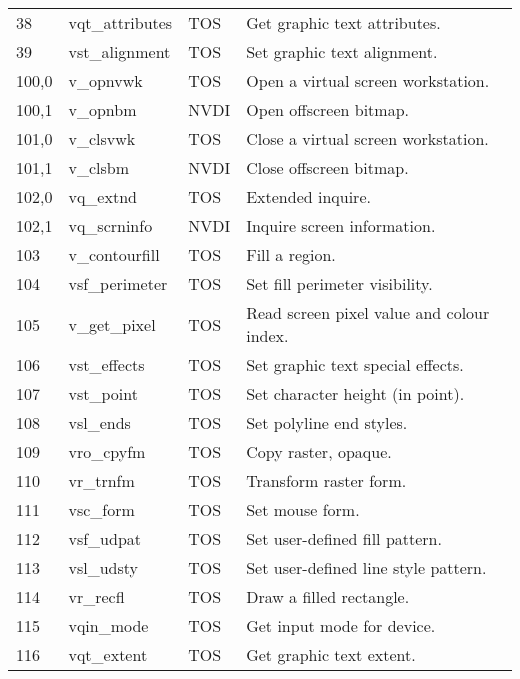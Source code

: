 \documentclass[a4paper]{article}
\begin{document}
\begin{supertabular}{|p{1.8cm}|p{3.0cm}|p{1.5cm}|p{8.7cm}|}
38              & vqt\_attributes     & TOS   & Get graphic text attributes. \\
39              & vst\_alignment      & TOS   & Set graphic text alignment. \\
100,0           & v\_opnvwk           & TOS   & Open a virtual screen workstation. \\
100,1           & v\_opnbm            & NVDI  & Open offscreen bitmap.\\
101,0           & v\_clsvwk           & TOS   & Close a virtual screen workstation. \\
101,1           & v\_clsbm            & NVDI  & Close offscreen bitmap.\\
102,0           & vq\_extnd           & TOS   & Extended inquire. \\
102,1           & vq\_scrninfo        & NVDI  & Inquire screen information.\\
103             & v\_contourfill      & TOS   & Fill a region. \\
104             & vsf\_perimeter      & TOS   & Set fill perimeter visibility. \\
105             & v\_get\_pixel       & TOS   & Read screen pixel value and colour index. \\
106             & vst\_effects        & TOS   & Set graphic text special effects. \\
107             & vst\_point          & TOS   & Set character height (in point). \\
108             & vsl\_ends           & TOS   & Set polyline end styles. \\
109             & vro\_cpyfm          & TOS   & Copy raster, opaque. \\
110             & vr\_trnfm           & TOS   & Transform raster form. \\
111             & vsc\_form           & TOS   & Set mouse form. \\
112             & vsf\_udpat          & TOS   & Set user-defined fill pattern. \\
113             & vsl\_udsty          & TOS   & Set user-defined line style pattern. \\
114             & vr\_recfl           & TOS   & Draw a filled rectangle. \\
115             & vqin\_mode          & TOS   & Get input mode for device. \\
116             & vqt\_extent         & TOS   & Get graphic text extent. \\

\end{supertabular}
\end{document}
